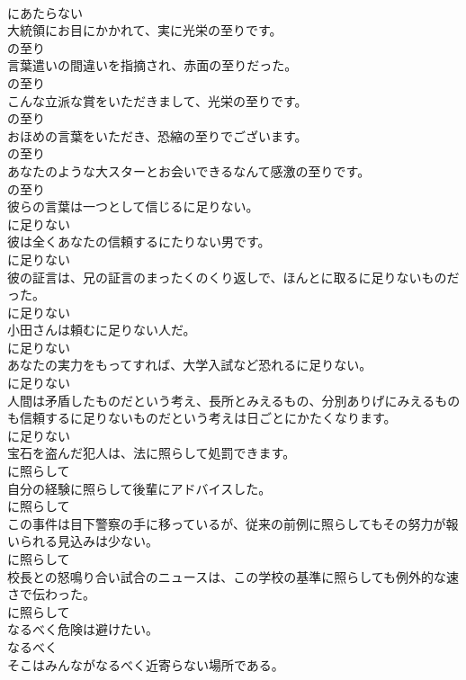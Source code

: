 \documentclass[8pt]{extreport}
\begin{document}
\begin{CJK}{UTF8}{min}
\\	にあたらない	
\\	大統領にお目にかかれて、実に光栄の至りです。	
\\	の至り	
\\	言葉遣いの間違いを指摘され、赤面の至りだった。	
\\	の至り	
\\	こんな立派な賞をいただきまして、光栄の至りです。	
\\	の至り	
\\	おほめの言葉をいただき、恐縮の至りでございます。	
\\	の至り	
\\	あなたのような大スターとお会いできるなんて感激の至りです。	
\\	の至り	
\\	彼らの言葉は一つとして信じるに足りない。	
\\	に足りない	
\\	彼は全くあなたの信頼するにたりない男です。	
\\	に足りない	
\\	彼の証言は、兄の証言のまったくのくり返しで、ほんとに取るに足りないものだった。	
\\	に足りない	
\\	小田さんは頼むに足りない人だ。	
\\	に足りない	
\\	あなたの実力をもってすれば、大学入試など恐れるに足りない。	
\\	に足りない	
\\	人間は矛盾したものだという考え、長所とみえるもの、分別ありげにみえるものも信頼するに足りないものだという考えは日ごとにかたくなります。	
\\	に足りない	
\\	宝石を盗んだ犯人は、法に照らして処罰できます。	
\\	に照らして	
\\	自分の経験に照らして後輩にアドバイスした。	
\\	に照らして	
\\	この事件は目下警察の手に移っているが、従来の前例に照らしてもその努力が報いられる見込みは少ない。	
\\	に照らして	
\\	校長との怒鳴り合い試合のニュースは、この学校の基準に照らしても例外的な速さで伝わった。	
\\	に照らして	
\\	なるべく危険は避けたい。	
\\	なるべく	
\\	そこはみんながなるべく近寄らない場所である。	

\end{CJK}
\end{document}
